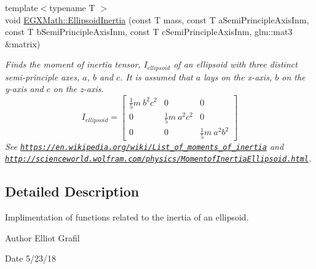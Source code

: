 \begin{DoxyCompactItemize}
{\footnotesize template$<$typename T $>$ }\\void \mbox{\hyperlink{group___e_g_x_math-_geometry-3_d-_ellipsoid-_inertia_gaed602dd93a68fdd7d4bafe883b093153}{E\+G\+X\+Math\+::\+Ellipsoid\+Inertia}} (const T mass, const T a\+Semi\+Principle\+Axis\+Inm, const T b\+Semi\+Principle\+Axis\+Inm, const T c\+Semi\+Principle\+Axis\+Inm, glm\+::mat3 \&matrix)
\begin{DoxyCompactList}\small\item\em Finds the moment of inertia tensor, $I_{ellipsoid}$ of an ellipsoid with three distinct semi-\/principle axes, $a$, $b$ and $c$. It is assumed that $a$ lays on the x-\/axis, $b$ on the y-\/axis and $c$ on the z-\/axis. \[ I_{ellipsoid}=\begin{bmatrix} \frac{1}{5}m\ b^2c^2 & 0 & 0\\ 0 & \frac{1}{5}m\ a^2c^2 & 0\\ 0 & 0 & \frac{1}{5}m\ a^2b^2 \end{bmatrix} \] See \href{https://en.wikipedia.org/wiki/List_of_moments_of_inertia}{\tt https\+://en.\+wikipedia.\+org/wiki/\+List\+\_\+of\+\_\+moments\+\_\+of\+\_\+inertia} and \href{http://scienceworld.wolfram.com/physics/MomentofInertiaEllipsoid.html}{\tt http\+://scienceworld.\+wolfram.\+com/physics/\+Momentof\+Inertia\+Ellipsoid.\+html}. \end{DoxyCompactList}\end{DoxyCompactItemize}


\subsection{Detailed Description}
Implimentation of functions related to the inertia of an ellipsoid. 

\begin{DoxyAuthor}{Author}
Elliot Grafil 
\end{DoxyAuthor}
\begin{DoxyDate}{Date}
5/23/18 
\end{DoxyDate}
